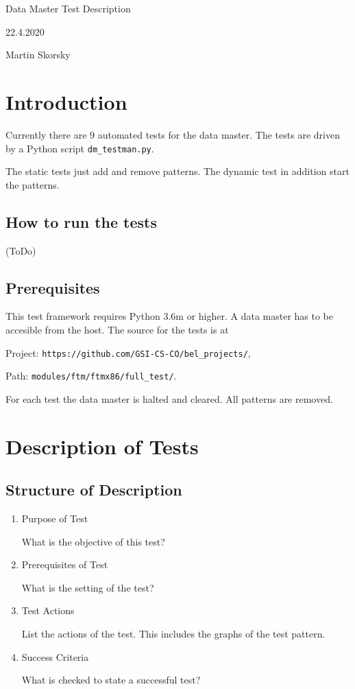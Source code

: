 \documentclass[12pt,a4paper]{report}
\begin{document}
\begin{titlepage}
Data Master Test Description

22.4.2020

Martin Skorsky
\end{titlepage}

\chapter{Introduction}
Currently there are 9 automated tests for the data master. The tests are driven by a Python script \texttt{dm\_testman.py}.

The static tests just add and remove patterns. The dynamic test in addition start the patterns.
\section{How to run the tests}
(ToDo)
\section{Prerequisites}
This test framework requires Python 3.6m or higher. A data master has to be accesible from the host. 
The source for the tests is at 

Project: \texttt{https://github.com/GSI-CS-CO/bel\_projects/},

Path: \texttt{modules/ftm/ftmx86/full\_test/}.

For each test the data master is halted and cleared. All patterns are removed.

\chapter{Description of Tests}
\section{Structure of Description}
\begin{enumerate}
	\item Purpose of Test

	What is the objective of this test?
	\item Prerequisites of Test

	What is the setting of the test?
	\item Test Actions

	List the actions of the test. This includes the graphs of the test pattern.
	\item Success Criteria

	What is checked to state a successful test?
\end{enumerate}
\end{document}
